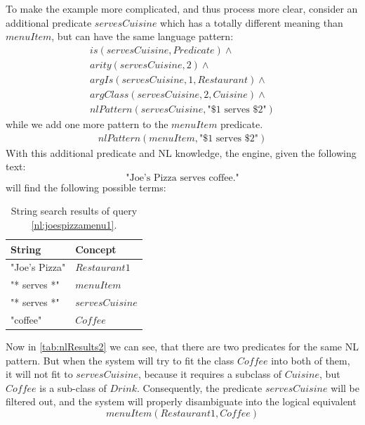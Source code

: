 To make the example more complicated, and thus process more clear, consider
an additional predicate $servesCuisine$ which has a totally different meaning
than $menuItem$, but can have the same language pattern:
\begin{equation*}
\begin{gathered}
    is(servesCuisine,Predicate) \land \\
	arity(servesCuisine,2)\land\\
	argIs(servesCuisine,1,Restaurant) \land\\
	argClass(servesCuisine,2, Cuisine) \land \\
	nlPattern(servesCuisine, \text{"\$1 serves \$2"}) 
\end{gathered}
\end{equation*}
while we add one more pattern to the $menuItem$ predicate.
\begin{equation*}
\begin{gathered}
	nlPattern(menuItem, \text{"\$1 serves \$2"}) 
\end{gathered}
\end{equation*}
With this additional predicate and NL knowledge, the engine, given the following
text:
\begin{equation}\label{nl:joespizzamenu1}
\text{"Joe's Pizza serves coffee."}
\end{equation}
will find the following possible terms:

\begin{table}[H]
\centering
\caption{String search results of query \ref{nl:joespizzamenu1}.}
\label{tab:nlResults2}
\begin{tabular}{|l|l|}
	\hline
	\textbf{String} & \textbf{Concept} \\
    \hline
    "Joe's Pizza" & $Restaurant1$ \\
    \hline
    "* serves *" & $menuItem$ \\
    \hline
	"* serves *" & $servesCuisine$\\
	\hline
    "coffee" & $Coffee$ \\
    \hline
\end{tabular}
\end{table}
Now in \autoref{tab:nlResults2} we can see, that there are two predicates
for the same NL pattern. But when the system will try to fit the class $Coffee$
into both of them, it will not fit to $servesCuisine$, because it requires
a subclass of $Cuisine$, but $Coffee$ is a sub-class of $Drink$. Consequently,
the predicate $servesCuisine$ will be filtered out, and the system will
properly disambiguate into the logical equivalent
\begin{equation*}
	menuItem(Restaurant1,Coffee)
\end{equation*}

